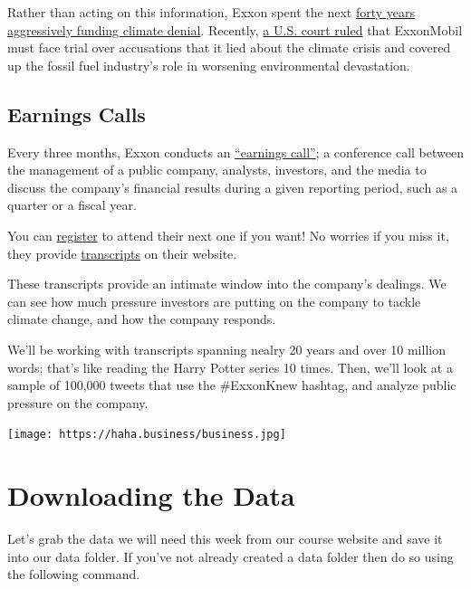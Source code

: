 \documentclass[
  letterpaper,
  DIV=11,
  numbers=noendperiod]{scrreprt}
\begin{document}
Rather than acting on this information, Exxon spent the next
\href{https://news.harvard.edu/gazette/story/2021/09/oil-companies-discourage-climate-action-study-says/}{forty
years aggressively funding climate denial}. Recently,
\href{https://www.theguardian.com/environment/2022/may/24/exxon-trial-climate-crimes-fossil-fuels-global-heating}{a
U.S. court ruled} that ExxonMobil must face trial over accusations that
it lied about the climate crisis and covered up the fossil fuel
industry's role in worsening environmental devastation.

\hypertarget{earnings-calls}{%
\subsection{Earnings Calls}\label{earnings-calls}}

Every three months, Exxon conducts an
\href{https://www.investopedia.com/terms/e/earnings-call.asp}{``earnings
call''}; a conference call between the management of a public company,
analysts, investors, and the media to discuss the company's financial
results during a given reporting period, such as a quarter or a fiscal
year.

You can
\href{https://globalmeet.webcasts.com/starthere.jsp?ei=1488251\&tp_key=440e363aaf}{register}
to attend their next one if you want! No worries if you miss it, they
provide
\href{https://corporate.exxonmobil.com/Investors/Investor-relations/Investor-materials-archive\#Quarterlyearningsmaterials}{transcripts}
on their website.

These transcripts provide an intimate window into the company's
dealings. We can see how much pressure investors are putting on the
company to tackle climate change, and how the company responds.

We'll be working with transcripts spanning nealry 20 years and over 10
million words; that's like reading the Harry Potter series 10 times.
Then, we'll look at a sample of 100,000 tweets that use the \#ExxonKnew
hashtag, and analyze public pressure on the company.

\texttt{[image: https://haha.business/business.jpg]}

\hypertarget{downloading-the-data-1}{%
\section{Downloading the Data}\label{downloading-the-data-1}}

Let's grab the data we will need this week from our course website and
save it into our data folder. If you've not already created a data
folder then do so using the following command.
\end{document}
